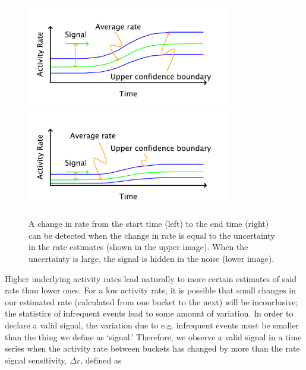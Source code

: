 \documentclass{article}
\begin{document}
%
\begin{figure}[h]
    \centering
    \includegraphics[width=3.5in]{./imgs/fig3a.pdf}
    \includegraphics[width=3.5in]{./imgs/fig3b.pdf}
        \caption{A change in rate from the start time (left) to the end time (right) can be detected when the change in rate is equal to the uncertainty in the rate estimates (shown in the upper image). When the uncertainty is large, the signal is hidden in the noise (lower image).}
    \label{fig:signal}
\end{figure}
%
%

Higher
\reversemarginpar\marginpar{\raggedleft
%
    \begin{tikzpicture}[scale=0.26]]
\draw [red, very thick, rotate around={60: (1.5, 2.598076211353316)}] (0.8, 1.898076211353316) rectangle(2.2, 3.298076211353316);
%
\draw [very thick, <->] (0.25000000000000006, 0.4330127018922193) -- (1.25, 2.165063509461097) ;
\draw [very thick, <->] (1.75, 2.165063509461097) -- (2.75, 0.4330127018922193) ;
\draw [very thick, <->] (2.5, 0) -- (0.5, 0) ;
%
\draw [orange, ultra thick] (0,0) circle [radius= 0.5 ];
\draw [yellow, ultra thick] ( 1.5 , 2.59807621135 ) circle [radius= 0.5 ];
\draw [green,  ultra thick] ( 3.0 , 0 ) circle [radius= 0.5 ];
    \end{tikzpicture}
%
%
}
underlying activity rates lead naturally to more certain estimates of said rate than lower ones. 
For a low activity rate, it is possible that small changes in our estimated rate 
(calculated from one bucket to the next) will be inconclusive; the statistics of infrequent events 
lead to some amount of variation. In order to declare a valid signal, the variation due to e.g. 
infrequent events must be smaller than the thing we define as `signal.' Therefore, we observe
a valid signal in a time series when the activity rate between buckets has changed by 
more than the rate signal sensitivity, $\Delta r$, defined as
\end{document}
